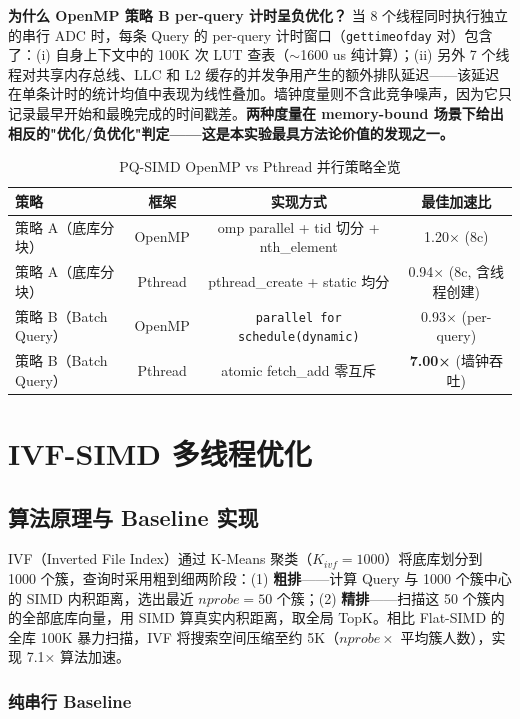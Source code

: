 \documentclass[UTF8,a4paper,10pt]{ctexart}
\begin{document}
\textbf{为什么 OpenMP 策略 B per-query 计时呈负优化？} 当 8 个线程同时执行独立的串行 ADC 时，每条 Query 的 per-query 计时窗口（\texttt{gettimeofday} 对）包含了：(i) 自身上下文中的 100K 次 LUT 查表（$\sim$1600 us 纯计算）；(ii) 另外 7 个线程对共享内存总线、LLC 和 L2 缓存的并发争用产生的额外排队延迟——该延迟在单条计时的统计均值中表现为线性叠加。墙钟度量则不含此竞争噪声，因为它只记录最早开始和最晚完成的时间戳差。\textbf{两种度量在 memory-bound 场景下给出相反的"优化/负优化"判定——这是本实验最具方法论价值的发现之一。}

\begin{table}[H]
\centering
\caption{PQ-SIMD OpenMP vs Pthread 并行策略全览}
\begin{tabular}{lccc}
\hline
策略 & 框架 & 实现方式 & 最佳加速比 \\
\hline
策略 A（底库分块） & OpenMP & omp parallel + tid 切分 + nth\_element & 1.20× (8c) \\
策略 A（底库分块） & Pthread & pthread\_create + static 均分 & 0.94× (8c, 含线程创建) \\
策略 B（Batch Query） & OpenMP & \texttt{parallel for schedule(dynamic)} & 0.93× (per-query) \\
策略 B（Batch Query） & Pthread & atomic fetch\_add 零互斥 & \textbf{7.00×} (墙钟吞吐) \\
\hline
\end{tabular}
\end{table}

\section{IVF-SIMD 多线程优化}

\subsection{算法原理与 Baseline 实现}

IVF（Inverted File Index）通过 K-Means 聚类（$K_{ivf}=1000$）将底库划分到 1000 个簇，查询时采用粗到细两阶段：(1) \textbf{粗排}——计算 Query 与 1000 个簇中心的 SIMD 内积距离，选出最近 $nprobe=50$ 个簇；(2) \textbf{精排}——扫描这 50 个簇内的全部底库向量，用 SIMD 算真实内积距离，取全局 TopK。相比 Flat-SIMD 的全库 100K 暴力扫描，IVF 将搜索空间压缩至约 5K（$nprobe \times$ 平均簇人数），实现 7.1× 算法加速。

\subsubsection{纯串行 Baseline}
\end{document}
